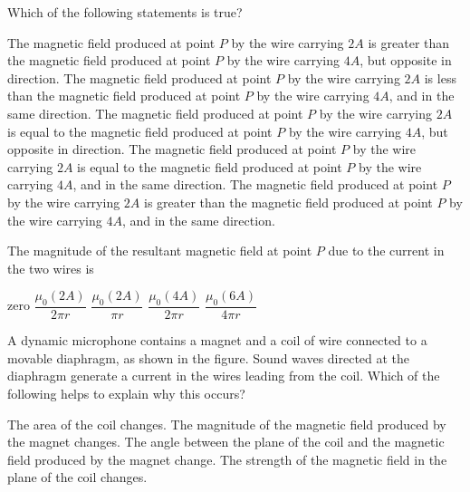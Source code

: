 \documentclass{../../oss-classkick-exam}
\begin{document}
\begin{multicols*}{2}
\begin{questions}
    \question Which of the following statements is true?
    \begin{choices}
      \choice The magnetic field produced at point $P$ by the wire carrying
      $2A$ is greater than the magnetic field produced at point $P$ by the wire
      carrying $4A$, but opposite in direction.
      \choice The magnetic field produced at point $P$ by the wire carrying
      $2A$ is less than the magnetic field produced at point $P$ by the wire
      carrying $4A$, and in the same direction.
      \choice The magnetic field produced at point $P$ by the wire carrying
      $2A$ is equal to the magnetic field produced at point $P$ by the wire
      carrying $4A$, but opposite in direction.
      \choice The magnetic field produced at point $P$ by the wire carrying
      $2A$ is equal to the magnetic field produced at point $P$ by the wire
      carrying $4A$, and in the same direction.
      \choice The magnetic field produced at point $P$ by the wire carrying
      $2A$ is greater than the magnetic field produced at point $P$ by the wire
      carrying $4A$, and in the same direction.
    \end{choices}
    \label{q:2wires1}
    \vspace{.7in}
    
    \question The magnitude of the resultant magnetic field at point $P$ due to
    the current in the two wires is
    \begin{choices}
      \choice zero
      \choice $\dfrac{\mu_0(2A)}{2\pi r}$
      \choice $\dfrac{\mu_0(2A)}{\pi r}$
      \choice $\dfrac{\mu_0(4A)}{2\pi r}$
      \choice $\dfrac{\mu_0(6A)}{4\pi r}$
    \end{choices}
    \label{q:2wires2}
    \vspace{.7in}

    \question A dynamic microphone contains a magnet and a coil of wire
    connected to a movable diaphragm, as shown in the figure. Sound waves
    directed at the diaphragm generate a current in the wires leading from the
    coil. Which of the following helps to explain why this occurs?
    \begin{choices}
      \choice The area of the coil changes.
      \choice The magnitude of the magnetic field produced by the magnet
      changes.
      \choice The angle between the plane of the coil and the magnetic field
      produced by the magnet change.
      \choice The strength of the magnetic field in the plane of the coil
      changes.
    \end{choices}
    \vspace{.7in}
    \columnbreak


\end{questions}
\end{multicols*}
\end{document}
